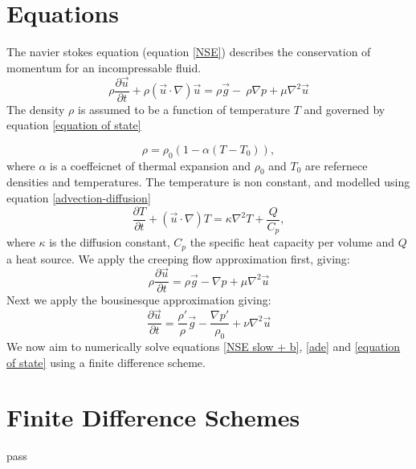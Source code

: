 \documentclass{article}
\begin{document}
\section*{Equations}
The navier stokes equation (equation \ref{NSE}) describes the conservation of momentum for an incompressable fluid.
\begin{equation}
	\rho \frac{\partial \vec{u}}{\partial t} + \rho (\vec{u} \cdot \nabla) \vec{u} = \rho \vec{g} - \ \rho {\nabla p} + \mu \nabla^2 \vec{u}
	\label{NSE}
\end{equation}
The density $\rho$ is assumed to be a function of temperature $T$ and governed by equation \ref{equation of state}

\begin{equation}
	\rho = \rho_0 (1- \alpha (T - T_0)),
	\label{equation of state}
\end{equation}
where $\alpha$ is a coeffeicnet of thermal expansion and $\rho_0$ and $T_0$ are refernece densities and temperatures. The temperature is non constant, and modelled using equation \ref{advection-diffusion}
\begin{equation}
	\frac{\partial T}{\partial t} + (\vec{u} \cdot \nabla) T = \kappa \nabla^2 T + \frac{Q}{C_p},
	\label{ade}
\end{equation}
where $\kappa$ is the diffusion constant, $C_p$ the specific heat capacity per volume and $Q$ a heat source.
\newline
We apply the creeping flow approximation first, giving:
\begin{equation}
	\rho \frac{\partial \vec{u}}{\partial t} = \rho \vec{g} - {\nabla p} + \mu \nabla^2 \vec{u}
	\label{NSE slow}
\end{equation}
Next we apply the bousinesque approximation giving:
\begin{equation}
	\frac{\partial \vec{u}}{\partial t} = \frac{\rho'}{\rho} \vec{g} -   \frac{\nabla p'}{\rho_0} + \nu \nabla^2 \vec{u}
	\label{NSE slow + b}
\end{equation}
We now aim to numerically solve equations \ref{NSE slow + b}, \ref{ade} and \ref{equation of state} using a finite difference scheme.

\section*{Finite Difference Schemes}
pass
\end{document}
